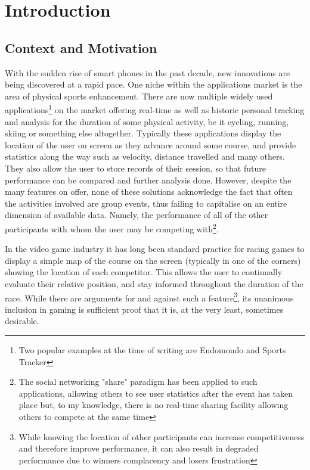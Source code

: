
\cleardoublepage        %

\setcounter{page}{1}
\pagestyle{headings}

\chapter{Introduction}

\section{Context and Motivation}

With the sudden rise of smart phones in the past decade, new innovations are being discovered at a rapid pace. One niche within the applications market is the area of physical sports enhancement. There are now multiple widely used applications\footnote{Two popular examples at the time of writing are Endomondo and Sports Tracker} on the market offering real-time as well as historic personal tracking and analysis for the duration of some physical activity, be it cycling, running, skiing or something else altogether.
Typically these applications display the location of the user on screen as they advance around some course, and provide statistics along the way such as velocity, distance travelled and many others. They also allow the user to store records of their session, so that future performance can be compared and further analysis done.
However, despite the many features on offer, none of these solutions acknowledge the fact that often the activities involved are group events, thus failing to capitalise on an entire dimension of available data. Namely, the performance of all of the other participants with whom the user may be competing with\footnote{The social networking "share" paradigm has been applied to such applications, allowing others to see user statistics after the event has taken place but, to my knowledge, there is no real-time sharing facility allowing others to compete at the same time}.

In the video game industry it has long been standard practice for racing games to display a simple map of the course on the screen (typically in one of the corners) showing the location of each competitor. This allows the user to continually evaluate their relative position, and stay informed throughout the duration of the race. While there are arguments for and against such a feature\footnote{While knowing the location of other participants can increase competitiveness and therefore improve performance, it can also result in degraded performance due to winners complacency and losers frustration}, its unanimous inclusion in gaming is sufficient proof that it is, at the very least, sometimes desirable.

